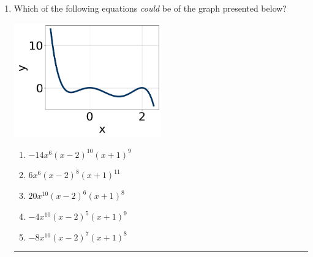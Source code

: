 \documentclass[14pt]{extbook}
\newcommand{\litem}[1]{\item#1\hspace*{-1cm}\rule{\textwidth}{0.4pt}}
\begin{document}
\begin{enumerate}
{\begin{enumerate}[label=\Alph*.]
\end{enumerate} }
\litem{
Which of the following equations \textit{could} be of the graph presented below?
\begin{center}
    \includegraphics[width=0.5\textwidth]{../Figures/polyGraphToFunctionA.png}
\end{center}
\begin{enumerate}[label=\Alph*.]
\item \( -14x^{6} (x - 2)^{10} (x + 1)^{9} \)
\item \( 6x^{6} (x - 2)^{8} (x + 1)^{11} \)
\item \( 20x^{10} (x - 2)^{6} (x + 1)^{8} \)
\item \( -4x^{10} (x - 2)^{5} (x + 1)^{9} \)
\item \( -8x^{10} (x - 2)^{7} (x + 1)^{8} \)


\end{enumerate}}
\end{enumerate}
\end{document}

